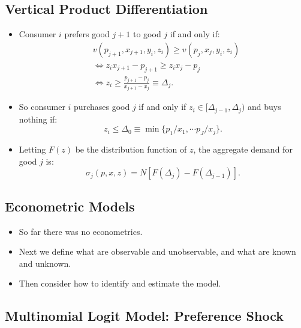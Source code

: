 \documentclass[
]{book}
\providecommand{\tightlist}{%
  \setlength{\itemsep}{0pt}\setlength{\parskip}{0pt}}
\begin{document}
\hypertarget{vertical-product-differentiation-1}{%
\subsection{Vertical Product Differentiation}\label{vertical-product-differentiation-1}}

\begin{itemize}
\tightlist
\item
  Consumer \(i\) prefers good \(j + 1\) to good \(j\) if and only if:
  \begin{equation}
  \begin{split}
  &v(p_{j + 1}, x_{j + 1}, y_i, z_i) \ge v(p_j, x_j, y_i, z_i)\\
  &\Leftrightarrow z_i x_{j + 1} - p_{j + 1} \ge z_i x_j - p_j\\
  &\Leftrightarrow z_i \ge \frac{p_{j + 1} - p_j}{x_{j + 1} - x_j} \equiv \Delta_j.
  \end{split}
  \end{equation}
\item
  So consumer \(i\) purchases good \(j\) if and only if \(z_i \in [\Delta_{j - 1}, \Delta_j)\) and buys nothing if:
  \begin{equation}
  z_i \le \Delta_0 \equiv \min\{p_1/x_1, \cdots p_J/x_j\}.
  \end{equation}
\item
  Letting \(F(z)\) be the distribution function of \(z\), the aggregate demand for good \(j\) is:
  \begin{equation}
  \sigma_j(p, x, z) = N[F(\Delta_{j}) - F(\Delta_{j - 1})].
  \end{equation}
\end{itemize}

\hypertarget{econometric-models}{%
\subsection{Econometric Models}\label{econometric-models}}

\begin{itemize}
\tightlist
\item
  So far there was no econometrics.
\item
  Next we define what are observable and unobservable, and what are known and unknown.
\item
  Then consider how to identify and estimate the model.
\end{itemize}

\hypertarget{multinomial-logit-model-preference-shock}{%
\subsection{Multinomial Logit Model: Preference Shock}\label{multinomial-logit-model-preference-shock}}
\end{document}
